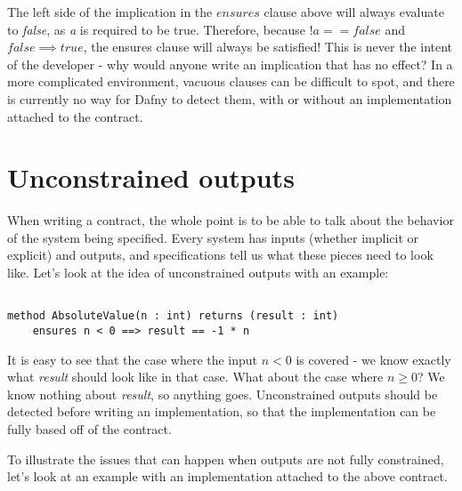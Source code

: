 \documentclass{article}
\newif\ifcomments
\newcommand{\cass}[1]{\ifcomments\textcolor{blue}{cass: #1}\fi}
\begin{document}
The left side of the implication in the \(ensures\) clause above will always evaluate to {\it false}, as {\it a} is required to be true. 
Therefore, because \(!a == false\) and \(false \implies true\), the ensures clause will always be satisfied! This is never the intent of the 
developer - why would anyone write an implication that has no effect? In a more complicated environment, vacuous clauses can be difficult to 
spot, and there is currently no way for Dafny to detect them, with or without an implementation attached to
the contract.

\cass{It is kind of bothering me that a contradiction in the preconditions of a method creates vacuity (because preconditions -> postconditions), but 
I talk about contradictions in preconditions in the contradictions section and not the vacuity section. Do you think things make sense the way I have them?}

\section{Unconstrained outputs}

When writing a contract, the whole point is to be able to talk about the behavior of the system being specified.
Every system has inputs (whether implicit or explicit) and outputs, and specifications tell us what these pieces need
to look like. Let’s look at the idea of unconstrained outputs with an example:

\begin{lstlisting}

method AbsoluteValue(n : int) returns (result : int)
    ensures n < 0 ==> result == -1 * n

\end{lstlisting}

It is easy to see that the case where the input \(n < 0\) is covered - we know exactly what {\it result} should look like in that case. 
What about the case where \(n \geq 0\)? We know nothing about {\it result}, so anything goes. Unconstrained outputs should be detected before 
writing an implementation, so that the implementation can be fully based off of the contract. 

To illustrate the issues that can happen when outputs are not fully constrained, let's look at an example with an implementation attached to the 
above contract. \cass{Let me know if I should just take this implementation part out. I kind of feel like it's helpful to see that with an 
unconstrained output, there are parts of the implementation that won't affect verification at all.}
\end{document}

